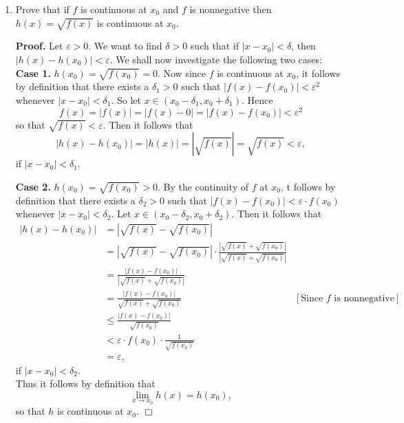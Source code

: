 \documentclass[9pt]{article}
\newcommand{\qed}{\hfill \ensuremath{\Box}}
\begin{document}
\begin{enumerate}
   \item Prove that if $f$ is continuous at $x_0$ and $f$ is nonnegative then
         $h(x) = \sqrt{f(x)}$ is continuous at $x_0$.
         
      \textbf{Proof.} Let $\varepsilon > 0$. We want to find $\delta > 0$ such
      that if $|x - x_0| < \delta$, then $|h(x) - h(x_0)| < \varepsilon$. We
      shall now investigate the following two cases: \\
      
      \textbf{Case 1.} $h(x_0) = \sqrt{f(x_0)} = 0$. Now since $f$ is continuous
      at $x_0$, it follows by definition that there exists a $\delta_1 > 0$ such
      that $|f(x) - f(x_0)| < \varepsilon^2$ whenever $|x - x_0| < \delta_1$.
      So let $x \in (x_0 - \delta_1, x_0 + \delta_1)$. Hence
      $$f(x) = |f(x)| = |f(x) - 0| = |f(x) - f(x_0)| < \varepsilon^2$$
      so that $\sqrt{f(x)} < \varepsilon$. Then it follows that
      $$|h(x) - h(x_0)| = |h(x)| = |\sqrt{f(x)}| = \sqrt{f(x)} < \varepsilon,$$
      if $|x - x_0| < \delta_1$.
      
      \textbf{Case 2.} $h(x_0) = \sqrt{f(x_0)} > 0$.  By the continuity of $f$
      at $x_0$, t follows by definition
      that there exists a $\delta_2 > 0$ such that
      $\displaystyle|f(x) - f(x_0)| < \varepsilon \cdot f(x_0)$
      whenever $|x - x_0| < \delta_2$. Let
      $x \in (x_0 - \delta_2, x_0 + \delta_2)$. Then it follows that
      \begin{align*}
         |h(x) - h(x_0)| &= |\sqrt{f(x)} - \sqrt{f(x_0)}| \\
                         &= |\sqrt{f(x)} - \sqrt{f(x_0)}| \cdot
                            \frac{|\sqrt{f(x)} + \sqrt{f(x_0)}|}
                                 {|\sqrt{f(x)} + \sqrt{f(x_0)}|} \\
                         &= \frac{|f(x) - f(x_0)|}
                                 {|\sqrt{f(x)} + \sqrt{f(x_0)}|} \\
                         &= \frac{|f(x) - f(x_0)|}
                                 {\sqrt{f(x)} + \sqrt{f(x_0)}}
                            &[\text{Since }f \text{ is nonnegative}] \\
                         &\le \frac{|f(x) - f(x_0)|}
                                 {\sqrt{f(x_0)}} \\
                         &< \varepsilon \cdot f(x_0) \cdot
                            \frac{1}{\sqrt{f(x_0)}} \\
                         &= \varepsilon,
      \end{align*}
      if $|x - x_0| < \delta_2$. \\
      
      Thus it follows by definition that
      $$\lim_{x\rightarrow x_0}h(x) = h(x_0),$$
      so that $h$ is continuous at $x_0$. \qed
\end{enumerate}
\end{document}
